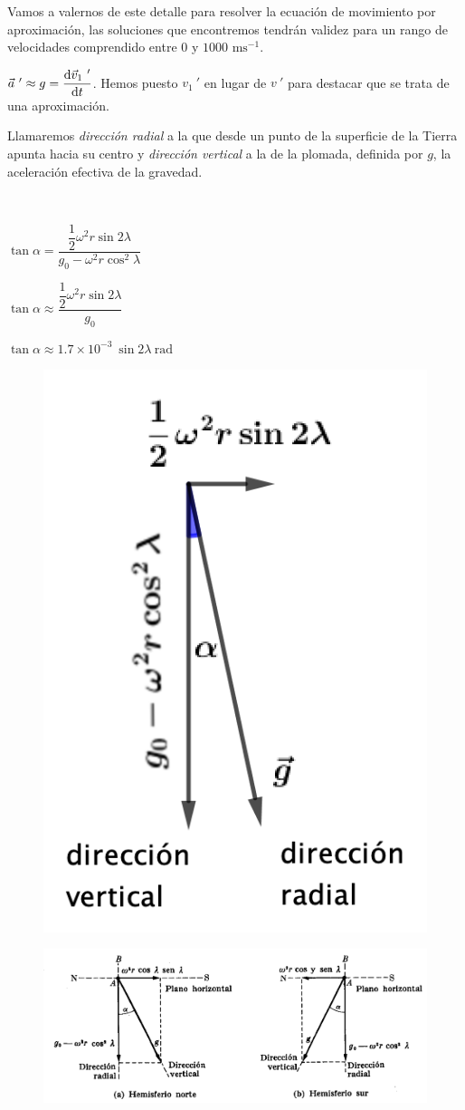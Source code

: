 Vamos a valernos de este detalle para resolver la ecuación de movimiento por aproximación, las soluciones que encontremos tendrán validez para un rango de velocidades comprendido entre $0$ y $1000 \text{ ms}^{-1}$.

$\vec a\ ' \approx g = \displaystyle \dv{\vec v_1\ '}{t}$. Hemos puesto $v_1\ '$ en lugar de $v\ '$ para destacar que se trata de una aproximación. 

Llamaremos \emph{dirección radial} a la que desde un punto de la superficie de la Tierra apunta hacia su centro y \emph{dirección vertical} a la de la plomada, definida por $g$, la aceleración efectiva de la gravedad.

\begin{multicols}{2}
$\quad $

$\tan \alpha=\dfrac{\dfrac 1 2 \omega^2 r \sin 2 \lambda}{g_0-\omega^2 r \cos^2\lambda}$

$\tan \alpha \approx \dfrac{\dfrac 1 2 \omega^2 r \sin 2 \lambda}{g_0}$

$\tan \alpha \approx 1.7\times 10^{-3}\ \sin 2 \lambda \ \mathrm{rad}$
\begin{figure}[H]
	\centering
	\includegraphics[width=.3\textwidth]{imagenes/imagenes11/T11IM05.png}
\end{figure}
\end{multicols}
\begin{figure}[H]
	\centering
	\includegraphics[width=1.05\textwidth]{imagenes/imagenes11/T11IM06.png}
\end{figure}

